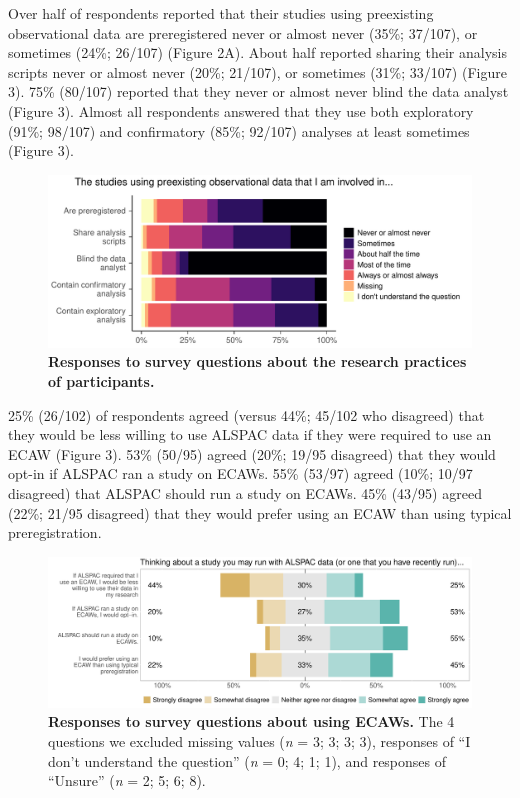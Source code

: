 \documentclass[
  man,floatsintext]{apa6}
\begin{document}
Over half of respondents reported that their studies using preexisting observational data are preregistered never or almost never (35\%; 37/107), or sometimes (24\%; 26/107) (Figure 2A). About half reported sharing their analysis scripts never or almost never (20\%; 21/107), or sometimes (31\%; 33/107) (Figure 3). 75\% (80/107) reported that they never or almost never blind the data analyst (Figure 3). Almost all respondents answered that they use both exploratory (91\%; 98/107) and confirmatory (85\%; 92/107) analyses at least sometimes (Figure 3).

\begin{figure}

{\centering \includegraphics[width=1\linewidth]{figs/methodPlot-1} 

}

\caption{\textbf{Responses to survey questions about the research practices of participants.}}\label{fig:methodPlot}
\end{figure}



25\% (26/102) of respondents agreed (versus 44\%; 45/102 who disagreed) that they would be less willing to use ALSPAC data if they were required to use an ECAW (Figure 3). 53\% (50/95) agreed (20\%; 19/95 disagreed) that they would opt-in if ALSPAC ran a study on ECAWs. 55\% (53/97) agreed (10\%; 10/97 disagreed) that ALSPAC should run a study on ECAWs. 45\% (43/95) agreed (22\%; 21/95 disagreed) that they would prefer using an ECAW than using typical preregistration.

\begin{figure}

{\centering \includegraphics[width=1\linewidth]{figs/alspacPlot-1} 

}

\caption{\textbf{Responses to survey questions about using ECAWs.} The 4 questions we excluded missing values (\emph{n} = 3; 3; 3; 3), responses of ``I don't understand the question'' (\emph{n} = 0; 4; 1; 1), and responses of ``Unsure'' (\emph{n} = 2; 5; 6; 8).}\label{fig:alspacPlot}
\end{figure}
\end{document}

